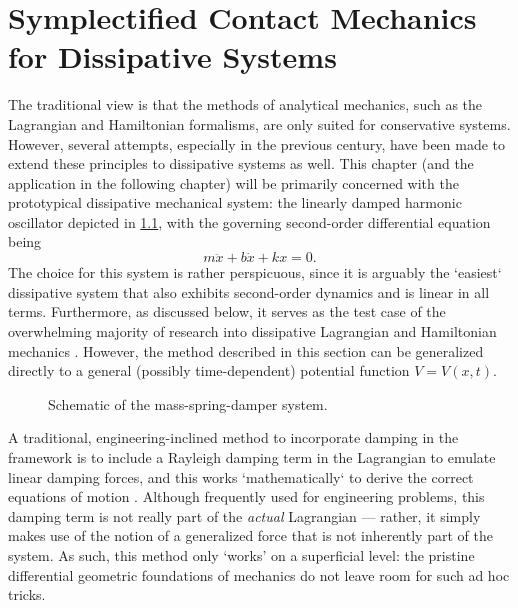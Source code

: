 \chapter{Symplectified Contact Mechanics for Dissipative Systems}

The traditional view is that the methods of analytical mechanics, such as the Lagrangian and Hamiltonian formalisms, are only suited for conservative systems. However, several attempts, especially in the previous century, have been made to extend these principles to dissipative systems as well. This chapter (and the application in the following chapter) will be primarily concerned with the prototypical dissipative mechanical system: the linearly damped harmonic oscillator depicted in \cref{fig:dho}, with the governing second-order differential equation being
\begin{equation}  
  m\ddot{x} + b\dot{x} + kx= 0.
\end{equation}
The choice for this system is rather perspicuous, since it is arguably the `easiest` dissipative system that also exhibits second-order dynamics and is linear in all terms. Furthermore, as discussed below, it serves as the test case of the overwhelming majority of research into dissipative Lagrangian and Hamiltonian mechanics \cite{Dekker1981,Hutters2020b}. However, the method described in this section can be generalized directly to a general (possibly time-dependent) potential function $V = V(x, t)$.
\begin{figure}
    \begin{center}
        
    \end{center}
    \caption{Schematic of the mass-spring-damper system.}
    \label{fig:dho}
\end{figure}


A traditional, engineering-inclined method to incorporate damping in the framework is to include a Rayleigh damping term in the Lagrangian to emulate linear damping forces, and this works `mathematically` to derive the correct equations of motion \cite{Goldstein2011}. Although frequently used for engineering problems, this damping term is not really part of the \emph{actual} Lagrangian --- rather, it simply makes use of the notion of a generalized force that is not inherently part of the system. As such, this method only `works' on a superficial level: the pristine differential geometric foundations of mechanics do not leave room for such ad hoc tricks.

